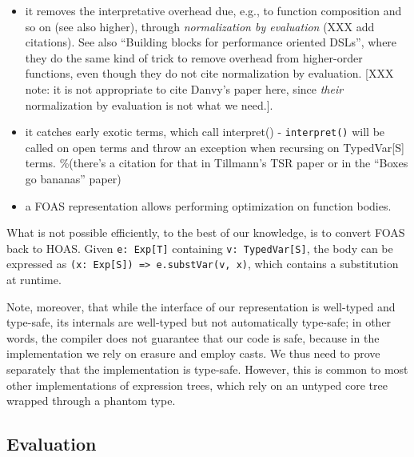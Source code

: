 \documentclass[preprint,authoryear,10pt]{sigplanconf}
\begin{document}
\begin{itemize}
\item
  it removes the interpretative overhead due, e.g., to function
  composition and so on (see also higher), through \emph{normalization
  by evaluation} (XXX add citations). See also ``Building blocks for
  performance oriented DSLs'', where they do the same kind of trick to
  remove overhead from higher-order functions, even though they do not
  cite normalization by evaluation. {[}XXX note: it is not appropriate
  to cite Danvy's paper here, since \emph{their} normalization by
  evaluation is not what we need.{]}.
\item
  it catches early exotic terms, which call interpret() -
  \texttt{interpret()} will be called on open terms and throw an
  exception when recursing on TypedVar{[}S{]} terms. \%(there's a
  citation for that in Tillmann's TSR paper or in the ``Boxes go
  bananas'' paper)
\item
  a FOAS representation allows performing optimization on function
  bodies.
\end{itemize}
What is not possible efficiently, to the best of our knowledge, is to
convert FOAS back to HOAS. Given \texttt{e: Exp{[}T{]}} containing
\texttt{v: TypedVar{[}S{]}}, the body can be expressed as
\texttt{(x: Exp{[}S{]}) =\textgreater{} e.substVar(v, x)}, which
contains a substitution at runtime.

Note, moreover, that while the interface of our representation is
well-typed and type-safe, its internals are well-typed but not
automatically type-safe; in other words, the compiler does not guarantee
that our code is safe, because in the implementation we rely on erasure
and employ casts. We thus need to prove separately that the
implementation is type-safe. However, this is common to most other
implementations of expression trees, which rely on an untyped core tree
wrapped through a phantom type.

\subsection{Evaluation}
\end{document}
